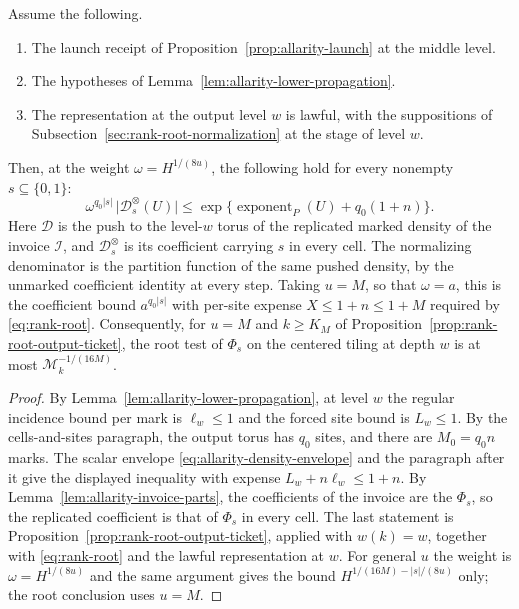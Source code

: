 \begin{proposition}
\label{prop:allarity-output-price}
Assume the following.
\begin{enumerate}
\item The launch receipt of Proposition~\ref{prop:allarity-launch} at the
 middle level.
\item The hypotheses of Lemma~\ref{lem:allarity-lower-propagation}.
\item The representation at the output level $w$ is lawful, with the
 suppositions of Subsection~\ref{sec:rank-root-normalization} at the stage
 of level $w$.
\end{enumerate}
Then, at the weight $\omega=H^{1/(8u)}$, the following hold for every
nonempty $s\subseteq\{0,1\}$:
\[
 \omega^{q_0|s|}\,\bigl|\mathcal D_s^{\otimes}(U)\bigr|
 \le\exp\{\operatorname{exponent}_P(U)+q_0(1+n)\}.
\]
Here $\mathcal D$ is the push to the level-$w$ torus of the replicated
marked density of the invoice $\mathcal I$, and $\mathcal D_s^{\otimes}$
is its coefficient carrying $s$ in every cell. The normalizing
denominator is the partition function of the same pushed density, by the
unmarked coefficient identity at every step. Taking $u=M$, so that
$\omega=a$, this is the coefficient bound $a^{q_0|s|}$ with per-site
expense $X\le1+n\le1+M$ required by \eqref{eq:rank-root}. Consequently,
for $u=M$ and $k\ge K_M$ of Proposition~\ref{prop:rank-root-output-ticket},
the root test of $\Phi_s$ on the centered tiling at depth $w$ is at most
$\mathcal M_k^{-1/(16M)}$.
\end{proposition}
\begin{proof}
By Lemma~\ref{lem:allarity-lower-propagation}, at level $w$ the regular
incidence bound per mark is $\ell_w\le1$ and the forced site bound is
$L_w\le1$. By the cells-and-sites paragraph, the output torus has $q_0$
sites, and there are $M_0=q_0n$ marks. The scalar envelope
\eqref{eq:allarity-density-envelope} and the paragraph after it give the
displayed inequality with expense $L_w+n\ell_w\le1+n$. By
Lemma~\ref{lem:allarity-invoice-parts}, the coefficients of the
invoice are the $\Phi_s$, so the replicated coefficient is that of
$\Phi_s$ in every cell. The last statement is
Proposition~\ref{prop:rank-root-output-ticket}, applied with $w(k)=w$,
together with \eqref{eq:rank-root} and the lawful representation at $w$.
For general $u$ the weight is $\omega=H^{1/(8u)}$ and the same argument
gives the bound $H^{1/(16M)-|s|/(8u)}$ only; the root conclusion uses
$u=M$.
\end{proof}

